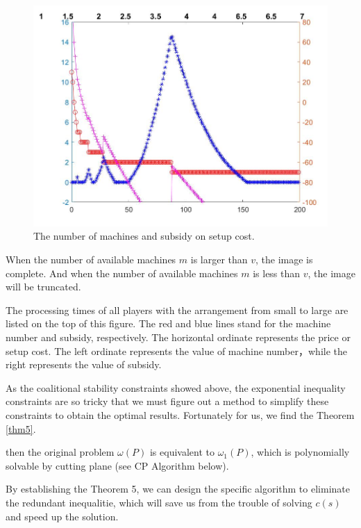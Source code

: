 \begin{figure}[h]%
	\centering  %
	\includegraphics[width=0.8\linewidth]{Figures/Image30}  %
	\caption{The number of machines and subsidy on setup cost.}  %
	\label{fig:Image11}   %
\end{figure}

When the number of available machines $m$ is larger than $v$, the image is complete. And when the number of available machines $m$ is less than $v$, the image will be truncated.

The processing times of all players with the arrangement from small to large are listed on the top of this figure.
The red and blue lines stand for the machine number and subsidy, respectively.
The horizontal ordinate represents the price or setup cost.
The left ordinate represents the value of machine number，while the right represents the value of subsidy.

As the coalitional stability constraints showed above, the exponential inequality constraints are so tricky that we must figure out a method to simplify these constraints to obtain the optimal results. Fortunately for us, we find the Theorem \ref{thm5}.

\begin{thm}\label{thm5}
then the original problem $\omega(P)$ is equivalent to $\omega_1(P)$, which is polynomially solvable by cutting plane (see CP Algorithm below).

\end{thm}

By establishing the Theorem 5, we can design the specific algorithm to eliminate the redundant inequalitie, which will save us from the trouble of solving $c(s)$ and speed up the solution.
